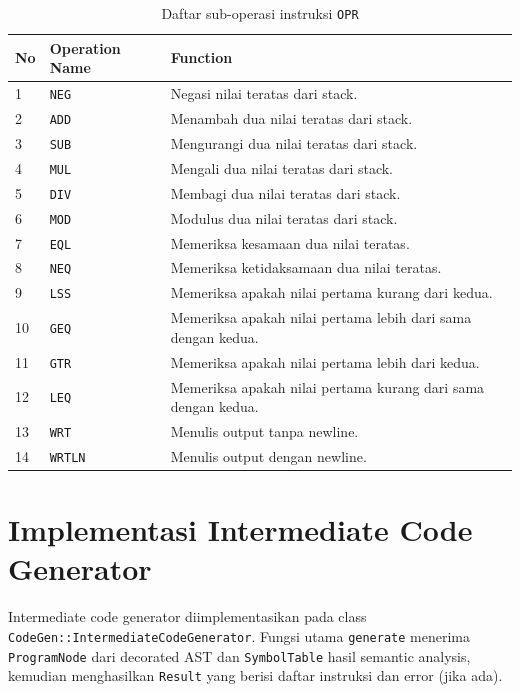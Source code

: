 \begin{table}[H]
    \centering
    \caption{Daftar sub-operasi instruksi \texttt{OPR}}
    \label{tab:opr-set}
    \begin{tabularx}{\textwidth}{C{1.2cm} L L}
        \toprule
        \textbf{No} & \textbf{Operation Name} & \textbf{Function} \\
         & \texttt{NEG} & Negasi nilai teratas dari stack. \\
        2 & \texttt{ADD} & Menambah dua nilai teratas dari stack. \\
        3 & \texttt{SUB} & Mengurangi dua nilai teratas dari stack. \\
        4 & \texttt{MUL} & Mengali dua nilai teratas dari stack. \\
        5 & \texttt{DIV} & Membagi dua nilai teratas dari stack. \\
        6 & \texttt{MOD} & Modulus dua nilai teratas dari stack. \\
        7 & \texttt{EQL} & Memeriksa kesamaan dua nilai teratas. \\
        8 & \texttt{NEQ} & Memeriksa ketidaksamaan dua nilai teratas. \\
        9 & \texttt{LSS} & Memeriksa apakah nilai pertama kurang dari kedua. \\
        10 & \texttt{GEQ} & Memeriksa apakah nilai pertama lebih dari sama dengan kedua. \\
        11 & \texttt{GTR} & Memeriksa apakah nilai pertama lebih dari kedua. \\
        12 & \texttt{LEQ} & Memeriksa apakah nilai pertama kurang dari sama dengan kedua. \\
        13 & \texttt{WRT} & Menulis output tanpa newline. \\
        14 & \texttt{WRTLN} & Menulis output dengan newline. \\
        \bottomrule
    \end{tabularx}
\end{table}

\section{Implementasi Intermediate Code Generator}
Intermediate code generator diimplementasikan pada class \texttt{CodeGen::IntermediateCodeGenerator}. Fungsi utama \texttt{generate} menerima \texttt{ProgramNode} dari decorated AST dan \texttt{SymbolTable} hasil semantic analysis, kemudian menghasilkan \texttt{Result} yang berisi daftar instruksi dan error (jika ada).

